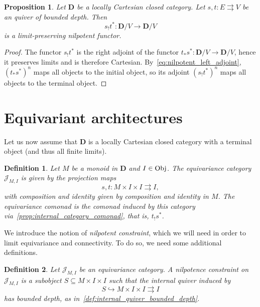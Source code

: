 \documentclass[12pt]{article}
\newtheorem{definition}{Definition}
\newtheorem{proposition}{Proposition}
\newcommand{\Obj}{{\textnormal{Obj}}}
\newcommand{\Cat}{{\mathbf{C}}}
\newcommand{\DCat}{{\mathbf{D}}}
\newcommand{\JCat}{{\mathcal{J}}}
\begin{document}
\begin{proposition}\label{prop:internal_quiver_functor}
    Let $\DCat$ be a locally Cartesian closed category. Let $s, t\colon E \rightrightarrows V$ be an quiver of bounded depth. Then
    \begin{equation*}
        s_!t^*\colon \DCat/V \rightarrow \DCat/V
    \end{equation*}
    is a limit-preserving nilpotent functor.
\end{proposition}

\begin{proof}
    The functor $s_!t^*$ is the right adjoint of the functor  $t_*s^*\colon \DCat/V \rightarrow \DCat/V$, hence it preserves limits and is therefore Cartesian. By~\cref{eq:nilpotent_left_adjoint}, $(t_*s^*)^n$ maps all objects to the initial object, so its adjoint $(s_!t^*)^n$ maps all objects to the terminal object.
\end{proof}

\section{Equivariant architectures}

Let us now assume that $\DCat$  is a locally Cartesian closed category with a terminal object (and thus all finite limits).

\begin{definition}\label{def:equivariance_category}
    Let $M$ be a monoid in $\DCat$ and $I \in \Obj$. The {\em equivariance category} $\JCat_{M, I}$ is given by the projection maps
    \begin{equation*}
        s, t\colon M \times I \times I \rightrightarrows I,
    \end{equation*}
    with composition and identity given by composition and identity in $M$. The {\em equivariance comonad} is the comonad induced by this category via~\cref{prop:internal_category_comonad}, that is, $t_!s^*$.
\end{definition}

We introduce the notion of {\em nilpotent constraint}, which we will need in order to limit equivariance and connectivity. To do so, we need some additional definitions.

\begin{definition}\label{def:nilpotent_architecture}
    Let $\JCat_{M, I}$ be an equivariance category. A {\em nilpotence constraint} on $\JCat_{M, I}$ is a subobject $S \subseteq M \times I \times I$ such that the internal quiver induced by
    \begin{equation*}
        S \hookrightarrow M \times I \times I \rightrightarrows I
    \end{equation*}
    has bounded depth, as in~\cref{def:internal_quiver_bounded_depth}.
\end{definition}
\end{document}
